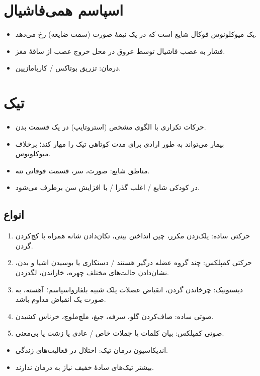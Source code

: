 \documentclass[a4paper,12pt]{extbook}
\begin{document}
\section*{اسپاسم همی‌فاشیال}
\begin{itemize}
\item یک میوکلونوس فوکال شایع است که در یک نیمهٔ صورت (سمت ضایعه) رخ می‌دهد.
\item فشار به عصب فاشیال توسط عروق در محل خروج عصب از ساقهٔ مغز.
\item درمان: تزریق بوتاکس / کاربامازپین.
\end{itemize}
\section*{تیک}
\begin{itemize}
\item حرکات تکراری با الگوی مشخص (استروتایپ) در یک قسمت بدن.
\item بیمار می‌تواند به طور ارادی برای مدت کوتاهی تیک را مهار کند؛ برخلاف میوکلونوس.
\item مناطق شایع: صورت، سر، قسمت فوقانی تنه.
\item در کودکی شایع / اغلب گذرا / با افزایش سن برطرف می‌شود.
\end{itemize}
\subsection*{انواع}
\begin{enumerate}[label=\alph*)]
\item حرکتی ساده: پلک‌زدن مکرر، چین انداختن بینی، تکان‌دادن شانه همراه با کج‌کردن گردن.
\item حرکتی کمپلکس: چند گروه عضله درگیر هستند / دستکاری یا بوسیدن اشیا و بدن، نشان‌دادن حالت‌های مختلف چهره، خاراندن، لگدزدن.
\item دیستونیک: چرخاندن گردن، انقباض عضلات پلک شبیه بلفارواسپاسم؛  آهسته، به صورت یک انقباض مداوم باشد.
\item صوتی ساده: صاف‌کردن گلو، سرفه، جیغ، ملچ‌ملوچ، خرناس کشیدن.
\item صوتی کمپلکس: بیان کلمات یا جملات خاص / عادی یا زشت یا بی‌معنی.
\end{enumerate}
\begin{itemize}
\item اندیکاسیون درمان تیک: اختلال در فعالیت‌های زندگی.
\item بیشتر تیک‌های سادهٔ خفیف نیاز به درمان ندارند.
\end{itemize}
\end{document}
